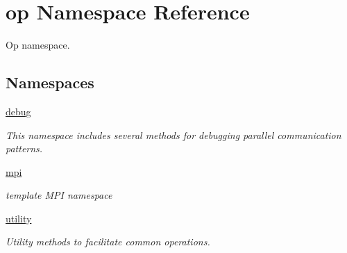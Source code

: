 \hypertarget{namespaceop}{\section{op Namespace Reference}
\label{namespaceop}
}


Op namespace.  


\subsection*{Namespaces}
\begin{DoxyCompactItemize}
\item 
\hyperlink{namespaceop_1_1debug}{debug}
\begin{DoxyCompactList}\small\item\em This namespace includes several methods for debugging parallel communication patterns. \end{DoxyCompactList}\item 
\hyperlink{namespaceop_1_1mpi}{mpi}
\begin{DoxyCompactList}\small\item\em template M\-P\-I namespace \end{DoxyCompactList}\item 
\hyperlink{namespaceop_1_1utility}{utility}
\begin{DoxyCompactList}\small\item\em Utility methods to facilitate common operations. \end{DoxyCompactList}\end{DoxyCompactItemize}
